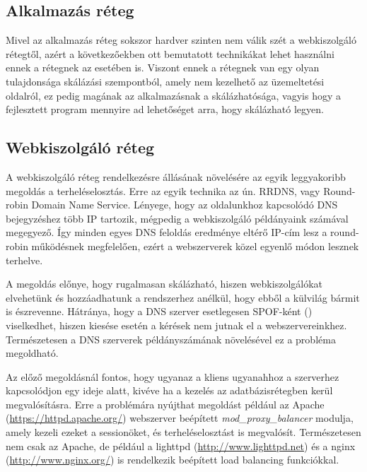 \subsection{Alkalmazás réteg}

Mivel az alkalmazás réteg sokszor hardver szinten nem válik szét a webkiszolgáló rétegtől, azért a következőekben ott bemutatott technikákat lehet használni ennek a rétegnek az esetében is.
Viszont ennek a rétegnek van egy olyan tulajdonsága skálázási szempontból, amely nem kezelhető az üzemeltetési oldalról, ez pedig magának az alkalmazásnak a skálázhatósága, vagyis hogy a fejlesztett program mennyire ad lehetőséget arra, hogy skálázható legyen.

\subsection{Webkiszolgáló réteg}

A webkiszolgáló réteg rendelkezésre állásának növelésére az egyik leggyakoribb megoldás a terheléselosztás. Erre az egyik technika az ún. RRDNS, vagy Round-robin Domain Name Service. Lényege, hogy az oldalunkhoz kapcsolódó DNS bejegyzéshez több IP tartozik, mégpedig a webkiszolgáló példányaink számával megegyező. Így minden egyes DNS feloldás eredménye eltérő IP-cím lesz a round-robin működésnek megfelelően, ezért a webszerverek közel egyenlő módon lesznek terhelve.

A megoldás előnye, hogy rugalmasan skálázható, hiszen webkiszolgálókat elvehetünk és hozzáadhatunk a rendszerhez anélkül, hogy ebből a külvilág bármit is észrevenne. Hátránya, hogy a DNS szerver esetlegesen SPOF-ként () viselkedhet, hiszen kiesése esetén a kérések nem jutnak el a webszervereinkhez. Természetesen a DNS szerverek példányszámának növelésével ez a probléma megoldható.

Az előző megoldásnál fontos, hogy ugyanaz a kliens ugyanahhoz a szerverhez kapcsolódjon egy  ideje alatt, kivéve ha a  kezelés az adatbázisrétegben kerül megvalósításra.
Erre a problémára nyújthat megoldást például az Apache (\href{https://httpd.apache.org/}{https://httpd.apache.org/}) webszerver beépített \textit{mod\_proxy\_balancer} modulja, amely kezeli ezeket a sessionöket, és terheléselosztást is megvalósít. Természetesen nem csak az Apache, de például a lighttpd (\href{http://www.lighttpd.net}{http://www.lighttpd.net}) és a nginx (\href{http://www.nginx.org/}{http://www.nginx.org/}) is rendelkezik beépített load balancing funkciókkal.

